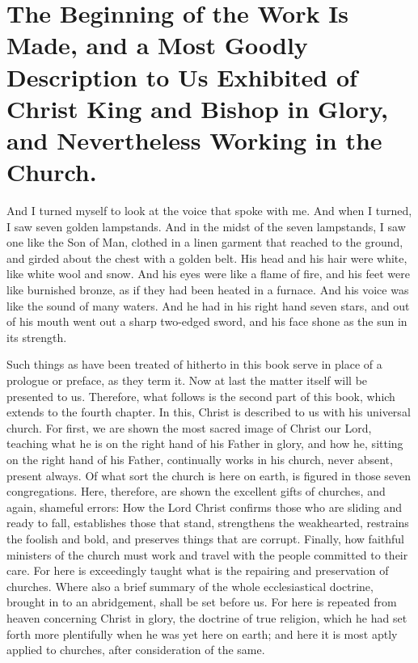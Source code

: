 \chapter[Sermon 5. The Beginning of the Work Is Made, and a Most Goodly Description to Us Exhibited of Christ King and Bishop in Glory, and Nevertheless Working in the Church.]{The Beginning of the Work Is Made, and a Most Goodly Description to Us Exhibited of Christ King and Bishop in Glory, and Nevertheless Working in the Church.}
\label{sermon:005}

And I turned myself to look at the voice that spoke with me. And when I turned, I saw seven golden lampstands. And in the midst of the seven lampstands, I saw one like the Son of Man, clothed in a linen garment that reached to the ground, and girded about the chest with a golden belt. His head and his hair were white, like white wool and snow. And his eyes were like a flame of fire, and his feet were like burnished bronze, as if they had been heated in a furnace. And his voice was like the sound of many waters. And he had in his right hand seven stars, and out of his mouth went out a sharp two-edged sword, and his face shone as the sun in its strength.

Such things as have been treated of hitherto in this book serve in place of a prologue or preface, as they term it. Now at last the matter itself will be presented to us. Therefore, what follows is the second part of this book, which extends to the fourth chapter. In this, Christ is described to us with his universal church. For first, we are shown the most sacred image of Christ our Lord, teaching what he is on the right hand of his Father in glory, and how he, sitting on the right hand of his Father, continually works in his church, never absent, present always. Of what sort the church is here on earth, is figured in those seven congregations. Here, therefore, are shown the excellent gifts of churches, and again, shameful errors: How the Lord Christ confirms those who are sliding and ready to fall, establishes those that stand, strengthens the weakhearted, restrains the foolish and bold, and preserves things that are corrupt. Finally, how faithful ministers of the church must work and travel with the people committed to their care. For here is exceedingly taught what is the repairing and preservation of churches. Where also a brief summary of the whole ecclesiastical doctrine, brought in to an abridgement, shall be set before us. For here is repeated from heaven concerning Christ in glory, the doctrine of true religion, which he had set forth more plentifully when he was yet here on earth; and here it is most aptly applied to churches, after consideration of the same.

